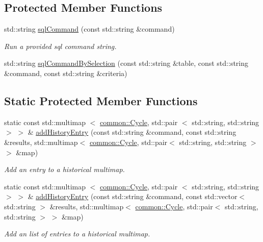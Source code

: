 \subsection*{\-Protected \-Member \-Functions}
\begin{DoxyCompactItemize}
\item 
std\-::string \hyperlink{classcryomesh_1_1manager_1_1DatabaseManager_a7a6bb580dd32e3af71670579e05663a1}{sql\-Command} (const std\-::string \&command)
\begin{DoxyCompactList}\small\item\em \-Run a provided sql command string. \end{DoxyCompactList}\item 
std\-::string \hyperlink{classcryomesh_1_1manager_1_1DatabaseManager_a409074c27567420f0a2d578f9a6bc124}{sql\-Command\-By\-Selection} (const std\-::string \&table, const std\-::string \&command, const std\-::string \&criteria)
\end{DoxyCompactItemize}
\subsection*{\-Static \-Protected \-Member \-Functions}
\begin{DoxyCompactItemize}
\item 
static const std\-::multimap\*
$<$ \hyperlink{classcryomesh_1_1common_1_1Cycle}{common\-::\-Cycle}, std\-::pair\*
$<$ std\-::string, std\-::string $>$ $>$ \& \hyperlink{classcryomesh_1_1manager_1_1DatabaseManager_a928357a9f8dc8f962dd1997258b4f26e}{add\-History\-Entry} (const std\-::string \&command, const std\-::string \&results, std\-::multimap$<$ \hyperlink{classcryomesh_1_1common_1_1Cycle}{common\-::\-Cycle}, std\-::pair$<$ std\-::string, std\-::string $>$ $>$ \&map)
\begin{DoxyCompactList}\small\item\em \-Add an entry to a historical multimap. \end{DoxyCompactList}\item 
static const std\-::multimap\*
$<$ \hyperlink{classcryomesh_1_1common_1_1Cycle}{common\-::\-Cycle}, std\-::pair\*
$<$ std\-::string, std\-::string $>$ $>$ \& \hyperlink{classcryomesh_1_1manager_1_1DatabaseManager_a5fd2be20d4f85aa6b61f0e42724f71ff}{add\-History\-Entry} (const std\-::string \&command, const std\-::vector$<$ std\-::string $>$ \&results, std\-::multimap$<$ \hyperlink{classcryomesh_1_1common_1_1Cycle}{common\-::\-Cycle}, std\-::pair$<$ std\-::string, std\-::string $>$ $>$ \&map)
\begin{DoxyCompactList}\small\item\em \-Add an list of entries to a historical multimap. \end{DoxyCompactList}\end{DoxyCompactItemize}
